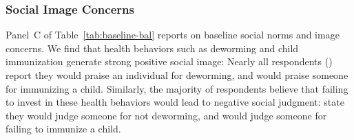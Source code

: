 \documentclass[12pt,a4paper]{article}
\begin{document}
\subsubsection{Social Image Concerns}
Panel~C of Table~\ref{tab:baseline-bal} reports on baseline social norms and image concerns. We find that health behaviors such as deworming and child immunization generate strong positive social image: Nearly all respondents () report they would praise an individual for deworming, and  would praise someone for immunizing a child. Similarly, the majority of respondents believe that failing to invest in these health behaviors would lead to negative social judgment:  state they would judge someone for not deworming, and  would judge someone for failing to immunize a child.
\end{document}
